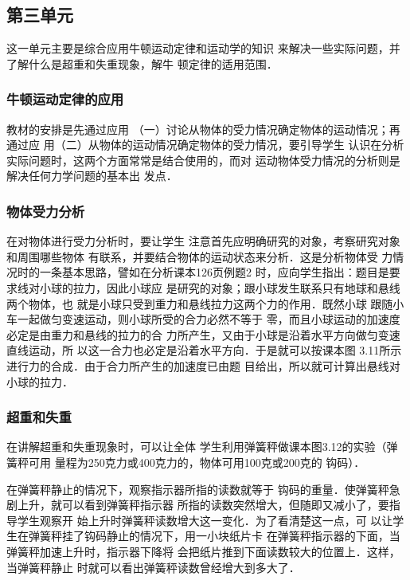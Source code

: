 \subsection{第三单元}
这一单元主要是综合应用牛顿运动定律和运动学的知识
来解决一些实际问题，并了解什么是超重和失重现象，解牛
顿定律的适用范围．

\subsubsection{牛顿运动定律的应用}

教材的安排是先通过应用
（一）讨论从物体的受力情况确定物体的运动情况；再通过应
用（二）从物体的运动情况确定物体的受力情况，要引导学生
认识在分析实际问题时，这两个方面常常是结合使用的，而对
运动物体受力情况的分析则是解决任何力学问题的基本出
发点．

\subsubsection{物体受力分析}

在对物体进行受力分析时，要让学生
注意首先应明确研究的对象，考察研究对象和周围哪些物体
有联系，并要结合物体的运动状态来分析．这是分析物体受
力情况时的一条基本思路，譬如在分析课本126页例题2
时，应向学生指出：题目是要求线对小球的拉力，因此小球应
是研究的对象；跟小球发生联系只有地球和悬线两个物体，也
就是小球只受到重力和悬线拉力这两个力的作用．既然小球
跟随小车一起做匀变速运动，则小球所受的合力必然不等于
零，而且小球运动的加速度必定是由重力和悬线的拉力的合
力所产生，又由于小球是沿着水平方向做匀变速直线运动，所
以这一合力也必定是沿着水平方向．于是就可以按课本图
3.11所示进行力的合成．由于合力所产生的加速度已由题
目给出，所以就可计算出悬线对小球的拉力．

\subsubsection{超重和失重} 在讲解超重和失重现象时，可以让全体
学生利用弹簧秤做课本图3.12的实验（弹簧秤可用
量程为250克力或400克力的，物体可用100克或200克的
钩码）．

在弹簧秤静止的情况下，观察指示器所指的读数就等于
钩码的重量．使弹簧秤急剧上升，就可以看到弹簧秤指示器
所指的读数突然增大，但随即又减小了，要指导学生观察开
始上升时弹簧秤读数增大这一变化．为了看清楚这一点，可
以让学生在弹簧秤挂了钩码静止的情况下，用一小块纸片卡
在弹簧秤指示器的下面，当弹簧秤加速上升时，指示器下降将
会把纸片推到下面读数较大的位置上．这样，当弹簧秤静止
时就可以看出弹簧秤读数曾经增大到多大了．

